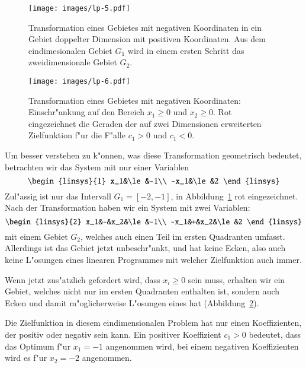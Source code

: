 \begin{figure}
\begin{center}
\texttt{[image: images/lp-5.pdf]}
\end{center}
\caption{Transformation eines Gebietes mit negativen Koordinaten
in ein Gebiet doppelter Dimension mit positiven Koordinaten.
Aus dem eindimesionalen Gebiet $G_1$ wird in einem ersten
Schritt das zweidimensionale Gebiet $G_2$.
\label{lp:transform-negative1}}
\end{figure}
\begin{figure}
\begin{center}
\texttt{[image: images/lp-6.pdf]}
\end{center}
\caption{Transformation eines Gebietes mit negativen Koordinaten:
Einschr"ankung auf den Bereich $x_1\ge 0$ und $x_2\ge 0$.
Rot eingezeichnet die Geraden der auf zwei Dimensionen erweiterten
Zielfunktion f"ur die F"alle $c_1>0$ und $c_1<0$.
\label{lp:transform-negative2}}
\end{figure}
Um besser verstehen zu k"onnen, was diese Transformation
geometrisch bedeutet, betrachten wir das System mit nur einer
Variablen
\begin{equation}
\begin{linsys}{1}
 x_1&\le&-1\\
-x_1&\le&2
\end{linsys}
\end{equation}
Zul"assig ist nur das Intervall $G_1=[-2,-1]$, in
Abbildung~\ref{lp:transform-negative1} rot eingezeichnet.
Nach der Transformation haben wir ein System mit zwei Variablen:
\begin{equation}
\begin{linsys}{2}
 x_1&-&x_2&\le&-1\\
-x_1&+&x_2&\le&2
\end{linsys}
\end{equation}
mit einem Gebiet $G_2$, welches auch einen Teil im ersten Quadranten
umfasst. Allerdings ist das Gebiet jetzt unbeschr"ankt, und hat keine
Ecken, also auch keine L"osungen eines linearen Programmes mit welcher
Zielfunktion auch immer.

Wenn jetzt zus"atzlich gefordert wird, dass $x_i\ge 0$ sein muss,
erhalten wir ein Gebiet, welches nicht nur im ersten Quadranten enthalten
ist, sondern auch Ecken und damit m"oglicherweise L"osungen eines hat
(Abbildung~\ref{lp:transform-negative2}).

Die Zielfunktion in diesem eindimensionalen Problem hat nur einen
Koeffizienten, der positiv oder negativ sein kann. Ein positiver 
Koeffizient $c_1>0$ bedeutet, dass das Optimum f"ur $x_1=-1$ angenommen
wird, bei einem negativen Koeffizienten wird es f"ur $x_2=-2$ angenommen.

